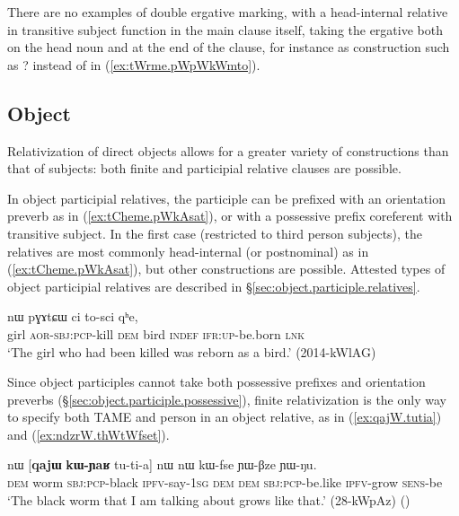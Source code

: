 There are no examples of double ergative marking, with a head-internal relative  in transitive subject function in the main clause itself, taking the ergative both on the head noun and at the end of the clause, for instance as construction such as ? instead of  in (\ref{ex:tWrme.pWpWkWmto}).

\subsection{Object} \label{sec:object.relativization}

Relativization of direct objects allows for a greater variety of constructions than that of subjects: both finite and participial relative clauses are possible. 

In object participial relatives, the participle can be prefixed with an orientation preverb as in (\ref{ex:tCheme.pWkAsat}), or with a possessive prefix coreferent with transitive subject. In the first case (restricted to third person subjects), the relatives are most commonly head-internal (or postnominal) as in (\ref{ex:tCheme.pWkAsat}), but other constructions are possible. Attested types of object participial relatives are described in §\ref{sec:object.participle.relatives}.

\begin{exe}
\ex \label{ex:tCheme.pWkAsat}
 nɯ pɣɤtɕɯ ci to-sci qʰe, \\
girl \textsc{aor}-\textsc{sbj}:\textsc{pcp}-kill \textsc{dem} bird \textsc{indef} \textsc{ifr}:\textsc{up}-be.born \textsc{lnk} \\
\glt `The girl who had been killed was reborn as a bird.' (2014-kWlAG)
\end{exe}

Since object participles cannot take both possessive prefixes and orientation preverbs (§\ref{sec:object.participle.possessive}), finite relativization is the only way to specify both TAME and person in an object relative, as in (\ref{ex:qajW.tutia}) and (\ref{ex:ndzrW.thWtWfset}).

\begin{exe}
\ex \label{ex:qajW.tutia}
\gll  nɯ [\textbf{qajɯ} \textbf{kɯ-ɲaʁ} tu-ti-a] nɯ nɯ kɯ-fse ɲɯ-βze ɲɯ-ŋu. \\
\textsc{dem} worm \textsc{sbj}:\textsc{pcp}-black \textsc{ipfv}-say-\textsc{1sg} \textsc{dem} \textsc{dem} \textsc{sbj}:\textsc{pcp}-be.like \textsc{ipfv}-grow \textsc{sens}-be \\
\glt `The black worm that I am talking about grows like that.' (28-kWpAz)
()
\end{exe}

